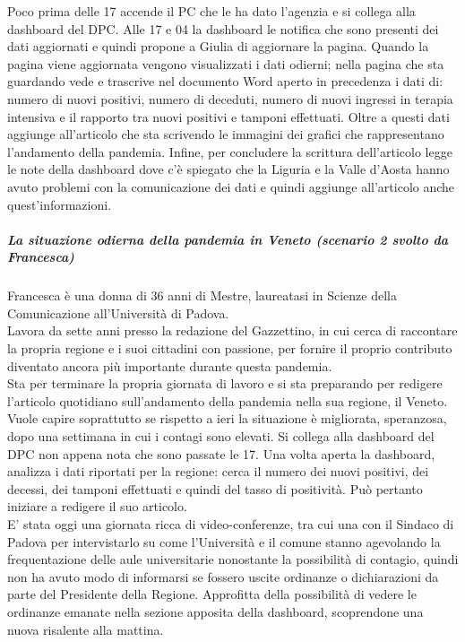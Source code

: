 Poco prima delle 17 accende il PC che le ha dato l'agenzia e si collega alla dashboard del DPC.
Alle 17 e 04 la dashboard le notifica che sono presenti dei dati aggiornati e quindi propone a Giulia di aggiornare la pagina.
Quando la pagina viene aggiornata vengono visualizzati i dati odierni; nella pagina che sta guardando vede e trascrive nel documento Word aperto in precedenza i dati di: numero di nuovi positivi, numero di deceduti, numero di nuovi ingressi in terapia intensiva e il rapporto tra nuovi positivi e tamponi effettuati.
Oltre a questi dati aggiunge all'articolo che sta scrivendo le immagini dei grafici che rappresentano l'andamento della pandemia.
Infine, per concludere la scrittura dell'articolo legge le note della dashboard dove c'è spiegato che la Liguria e la Valle d'Aosta hanno avuto problemi con la comunicazione dei dati e quindi aggiunge all'articolo anche quest'informazioni.
\noindent
\subparagraph{La situazione odierna della pandemia in Veneto (scenario 2 svolto da Francesca)}
Francesca è una donna di 36 anni di Mestre, laureatasi in Scienze della Comunicazione all'Università di Padova.\\
Lavora da sette anni presso la redazione del Gazzettino, in cui cerca di raccontare la propria regione e i suoi cittadini con passione, per fornire il proprio contributo diventato ancora più importante durante questa pandemia.\\
Sta per terminare la propria giornata di lavoro e si sta preparando per redigere l'articolo quotidiano sull'andamento della pandemia nella sua regione, il Veneto.\\
Vuole capire soprattutto se rispetto a ieri la situazione è migliorata, speranzosa, dopo una settimana in cui i contagi sono elevati. Si collega alla dashboard del DPC non appena nota che sono passate le 17.
Una volta aperta la dashboard, analizza i dati riportati per la regione: cerca il numero dei nuovi positivi, dei decessi, dei tamponi effettuati e quindi del tasso di positività. Può pertanto iniziare a redigere il suo articolo.\\
E' stata oggi una giornata ricca di video-conferenze, tra cui una con il Sindaco di Padova per intervistarlo su come l'Università e il comune stanno agevolando la frequentazione delle aule universitarie nonostante la possibilità di contagio, quindi non ha avuto modo di informarsi se fossero uscite ordinanze o dichiarazioni da parte del Presidente della Regione.
Approfitta della possibilità di vedere le ordinanze emanate nella sezione apposita della dashboard, scoprendone una nuova risalente alla mattina.
